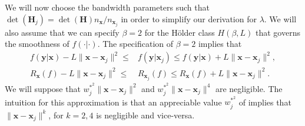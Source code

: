 \documentclass[11pt]{article}
\newcommand{\Hbf}{\textbf{H}}
\newcommand{\y}{\textbf{y}}
\newcommand{\x}{\textbf{x}}
\newcommand{\wstarsq}{w^{\textstyle{*}^2}}
\begin{document}
We will now choose the bandwidth parameters such that $\det(\Hbf_j) = \det(\Hbf)n_\x/n_{\x_j}$ in order to simplify our derivation for $\lambda$. We will also assume that we can specify $\beta = 2$ for the H{\"o}lder class $H(\beta,L)$ that governs the smoothness of $f(\cdot|\cdot)$. The specification of $\beta = 2$ implies that
\begin{align*}
  f(\y|\x) - L\|\x-\x_j\|^2 \leq &f(\y|\x_j) \leq f(\y|\x) + L\|\x-\x_j\|^2, \\
  R_\x(f) - L\|\x-\x_j\|^2 \leq &R_{\x_j}(f) \leq R_\x(f) + L\|\x-\x_j\|^2.
\end{align*}
We will suppose that $\wstarsq_j\|\x-\x_j\|^2$ and $\wstarsq_j\|\x-\x_j\|^4$ are negligible. The intuition for this approximation is that an appreciable value $\wstarsq_j$ of implies that $\|\x-\x_j\|^k$, for $k=2,4$ is negligible and vice-versa. 
\end{document}
